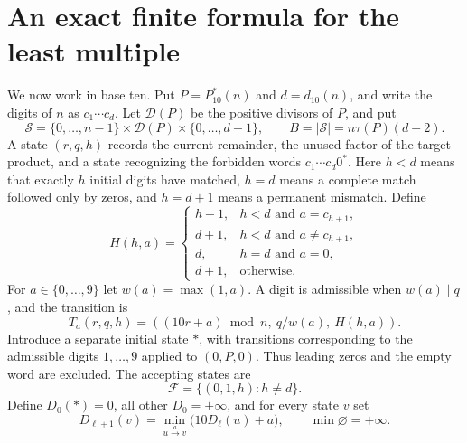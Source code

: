 \documentclass[10pt]{article}
\newcommand{\Pz}{P^{\!*}}
\begin{document}
\section{An exact finite formula for the least multiple}
We now work in base ten. Put $P=\Pz_{10}(n)$ and $d=d_{10}(n)$, and write
the digits of $n$ as $c_1\cdots c_d$. Let $\mathcal D(P)$ be the positive
divisors of $P$, and put
\[
 \mathcal S=\{0,\ldots,n-1\}\times\mathcal D(P)\times\{0,\ldots,d+1\},
 \qquad B=|\mathcal S|=n\tau(P)(d+2).
\]
A state $(r,q,h)$ records the current remainder, the unused factor of
the target product, and a state recognizing the forbidden words
$c_1\cdots c_d0^*$. Here $h<d$ means that exactly $h$ initial digits
have matched, $h=d$ means a complete match followed only by zeros,
and $h=d+1$ means a permanent mismatch. Define
\[
 H(h,a)=
 \begin{cases}
 h+1,&h<d\text{ and }a=c_{h+1},\\
 d+1,&h<d\text{ and }a\ne c_{h+1},\\
 d,&h=d\text{ and }a=0,\\
 d+1,&\text{otherwise}.
 \end{cases}
\]
For $a\in\{0,\ldots,9\}$ let $w(a)=\max(1,a)$. A digit is admissible
when $w(a)\mid q$, and the transition is
\begin{equation}\label{eq:transition}
 T_a(r,q,h)=((10r+a)\bmod n,\ q/w(a),\ H(h,a)).
\end{equation}
Introduce a separate initial state $*$, with transitions corresponding
to the admissible digits $1,\ldots,9$ applied to $(0,P,0)$. Thus leading
zeros and the empty word are excluded. The accepting states are
\[
 \mathcal F=\{(0,1,h):h\ne d\}.
\]
Define $D_0(*)=0$, all other $D_0=+\infty$, and for every state $v$ set
\begin{equation}\label{eq:dp}
 D_{\ell+1}(v)=\min_{u\xrightarrow{\ a\ }v}
       \bigl(10D_\ell(u)+a\bigr),\qquad \min\varnothing=+\infty.
\end{equation}
\end{document}
